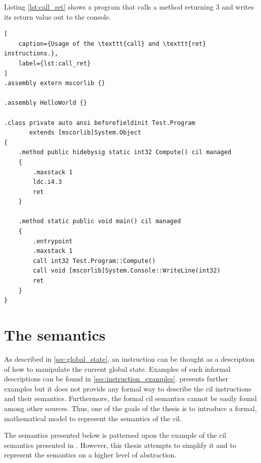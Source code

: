 \documentclass[declaration,shortabstract,english,mgr]{iithesis}
\begin{document}
Listing \ref{lst:call_ret} shows a program that calls a method returning $3$ and writes its return value out to the console.

\begin{lstlisting}[
	caption={Usage of the \texttt{call} and \texttt{ret} instructions.},
	label={lst:call_ret}
]
.assembly extern mscorlib {}

.assembly HelloWorld {}

.class private auto ansi beforefieldinit Test.Program
       extends [mscorlib]System.Object
{
	.method public hidebysig static int32 Compute() cil managed
	{
		.maxstack 1
		ldc.i4.3
		ret
	}

	.method static public void main() cil managed
	{
		.entrypoint
		.maxstack 1
		call int32 Test.Program::Compute()
		call void [mscorlib]System.Console::WriteLine(int32)
		ret
	}
}
\end{lstlisting}

\clearpage


\chapter{The semantics}
\label{sec:semantics}

As described in \ref{sec:global_state}, an instruction can be thought as a description of how to manipulate the current global state. Examples of such informal descriptions can be found in \ref{sec:instruction_examples}. \cite{ecmaStandard} presents further examples but it does not provide any formal way to describe the \acrshort{cil} instructions and their semantics. Furthermore, the formal \acrshort{cil} semantics cannot be easily found among other sources. Thus, one of the goals of the thesis is to introduce a formal, mathematical model to represent the semantics of the \acrshort{cil}.

The semantics presented below is patterned upon the example of the \acrshort{cil} semantics presented in \cite{zychlaThesis}. However, this thesis attempts to simplify it and to represent the semantics on a higher level of abstraction.
\end{document}
